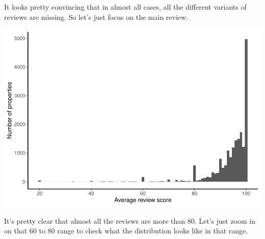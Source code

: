 \documentclass[
]{book}
\newenvironment{Shaded}{\begin{snugshade}}{\end{snugshade}}
\newcommand{\DataTypeTok}[1]{\textcolor[rgb]{0.13,0.29,0.53}{#1}}
\newcommand{\DecValTok}[1]{\textcolor[rgb]{0.00,0.00,0.81}{#1}}
\newcommand{\KeywordTok}[1]{\textcolor[rgb]{0.13,0.29,0.53}{\textbf{#1}}}
\newcommand{\NormalTok}[1]{#1}
\newcommand{\OperatorTok}[1]{\textcolor[rgb]{0.81,0.36,0.00}{\textbf{#1}}}
\newcommand{\StringTok}[1]{\textcolor[rgb]{0.31,0.60,0.02}{#1}}
\begin{document}
It looks pretty convincing that in almost all cases, all the different variants of reviews are missing. So let's just focus on the main review.

\begin{Shaded}
\end{Shaded}

\includegraphics{telling_stories_with_data_files/figure-latex/unnamed-chunk-313-1.pdf}

It's pretty clear that almost all the reviews are more than 80. Let's just zoom in on that 60 to 80 range to check what the distribution looks like in that range.
\end{document}
